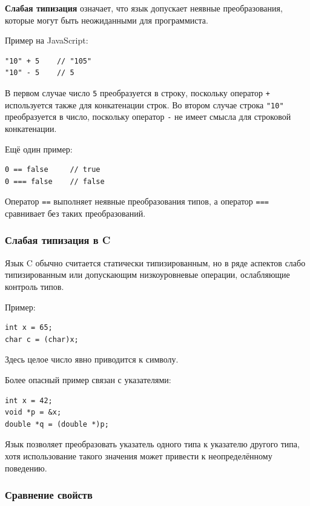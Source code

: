 \documentclass[12pt,a4paper]{article}
\begin{document}
\textbf{Слабая типизация} означает, что язык допускает неявные преобразования,
которые могут быть неожиданными для программиста.

Пример на JavaScript:

\begin{verbatim}
"10" + 5    // "105"
"10" - 5    // 5
\end{verbatim}

В первом случае число \texttt{5} преобразуется в строку, поскольку оператор
\texttt{+} используется также для конкатенации строк. Во втором случае строка
\texttt{"10"} преобразуется в число, поскольку оператор \texttt{-} не имеет смысла
для строковой конкатенации.

Ещё один пример:

\begin{verbatim}
0 == false     // true
0 === false    // false
\end{verbatim}

Оператор \texttt{==} выполняет неявные преобразования типов, а оператор \texttt{===}
сравнивает без таких преобразований.

\subsubsection{Слабая типизация в C}

Язык C обычно считается статически типизированным, но в ряде аспектов слабо
типизированным или допускающим низкоуровневые операции, ослабляющие контроль типов.

Пример:

\begin{verbatim}
int x = 65;
char c = (char)x;
\end{verbatim}

Здесь целое число явно приводится к символу.

Более опасный пример связан с указателями:

\begin{verbatim}
int x = 42;
void *p = &x;
double *q = (double *)p;
\end{verbatim}

Язык позволяет преобразовать указатель одного типа к указателю другого типа, хотя
использование такого значения может привести к неопределённому поведению.

\subsubsection{Сравнение свойств}
\end{document}
